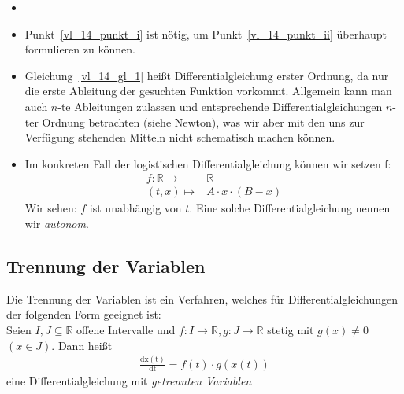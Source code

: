 \begin{Bemerkung}{
	\begin{itemize}
		\item[ ]
		\item Punkt~\ref{vl_14_punkt_i}
		ist nötig, um Punkt~\ref{vl_14_punkt_ii}	überhaupt formulieren zu können.
		\item Gleichung~\ref{vl_14_gl_1} heißt Differentialgleichung erster Ordnung, 
		da nur die erste Ableitung der gesuchten Funktion vorkommt. Allgemein kann 
		man auch $n$-te Ableitungen zulassen und entsprechende
		 Differentialgleichungen $n$-ter Ordnung betrachten (siehe Newton), 
		was wir aber mit den uns zur Verfügung stehenden Mitteln nicht schematisch
		 machen können.
		\item Im konkreten Fall der logistischen Differentialgleichung können 
		wir setzen f:
		\begin{align*}
			f : \mathbb{R} \rightarrow & \mathbb{R} \\
			(t,x) \mapsto & A\cdot x \cdot (B-x)
		\end{align*}
		Wir sehen: $f$ ist unabhängig von $t$. Eine solche Differentialgleichung 
		nennen wir \emph{autonom}.
	\end{itemize}
}\end{Bemerkung}

\subsection{Trennung der Variablen}
Die Trennung der Variablen ist ein Verfahren, welches für Differentialgleichungen
 der  folgenden Form geeignet ist: \\
 Seien $I, J \subseteq \mathbb{R}$ offene Intervalle und $f: I \rightarrow \mathbb{R}, g: J \rightarrow \mathbb{R}$ stetig mit $g(x) \neq 0$ $(x \in J)$.
 Dann heißt 
\begin{align}\label{vl_14_gl_2}
 	\frac{\mathrm{dx(t)}}{\mathrm{dt}} = f(t) \cdot g(x(t))
\end{align}  
eine Differentialgleichung mit \emph{getrennten Variablen}

